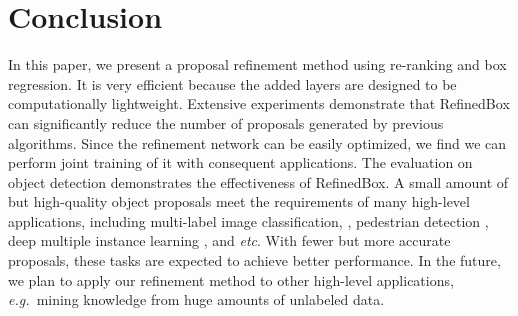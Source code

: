 \documentclass[10pt,twocolumn,letterpaper]{article}
\def\eg{\emph{e.g.~}}
\def\etc{\emph{etc}}
\begin{document}
\section{Conclusion}
%
In this paper, we present a proposal refinement
method using re-ranking and box regression.
%
It is very efficient because the added layers are designed
to be computationally lightweight.
Extensive experiments demonstrate that RefinedBox can significantly 
reduce the number of proposals generated by previous algorithms.
Since the refinement network can be easily optimized,
we find we can perform joint training of it with consequent applications.
%
The evaluation on object detection demonstrates the effectiveness
of RefinedBox.
%
A small amount of but high-quality object proposals meet the requirements
of many high-level applications, including multi-label image classification,
\cite{wei2016hcp}, pedestrian detection \cite{paisitkriangkrai2016pedestrian},
deep multiple instance learning \cite{wu2015deep}, and \etc.
With fewer but more accurate proposals, these tasks are expected to achieve
better performance.
%
In the future, we plan to apply our refinement method to other 
high-level applications, \eg mining knowledge from huge amounts of unlabeled data.



{\small


}
\end{document}
